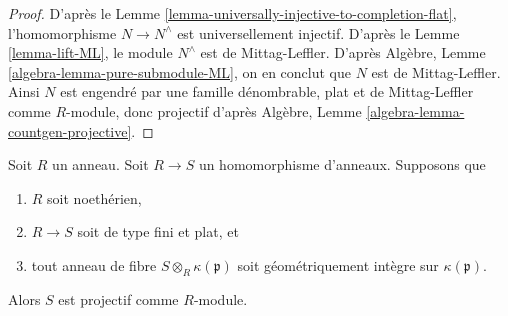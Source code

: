 \begin{proof}
D'après le
Lemme \ref{lemma-universally-injective-to-completion-flat},
l'homomorphisme $N \to N^\wedge$ est universellement injectif.
D'après le
Lemme \ref{lemma-lift-ML},
le module $N^\wedge$ est de Mittag-Leffler.
D'après
Algèbre, Lemme \ref{algebra-lemma-pure-submodule-ML},
on en conclut que $N$ est de Mittag-Leffler.
Ainsi $N$ est engendré par une famille dénombrable, plat et de Mittag-Leffler comme $R$-module,
donc projectif d'après
Algèbre, Lemme \ref{algebra-lemma-countgen-projective}.
\end{proof}

\begin{lemma}
\label{lemma-fibres-irreducible-flat-projective}
Soit $R$ un anneau.
Soit $R \to S$ un homomorphisme d'anneaux.
Supposons que
\begin{enumerate}
\item $R$ soit noethérien,
\item $R \to S$ soit de type fini et plat, et
\item tout anneau de fibre $S \otimes_R \kappa(\mathfrak p)$ soit
géométriquement intègre sur $\kappa(\mathfrak p)$.
\end{enumerate}
Alors $S$ est projectif comme $R$-module.
\end{lemma}

